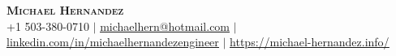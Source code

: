 \documentclass[letterpaper,11pt]{article}
\begin{document}

\begin{center}
    \textbf{\Huge \scshape Michael Hernandez} \\ \vspace{1pt}
    \small +1 503-380-0710 
    $|$ 
    \href{mailto:michaelhern@hotmail.com}{\underline{michaelhern@hotmail.com}} 
    $|$ 
    \href{https://www.linkedin.com/in/michaelhernandezengineer/}{\underline{linkedin.com/in/michaelhernandezengineer}} 
    $|$
    \href{https://michael-hernandez.info/}{\underline{https://michael-hernandez.info/}} 
\end{center}

\begin{comment}
\section{Summary}
\begin{itemize}[leftmargin=0.15in, label={}]
	\small{\item{Software engineering professional proficient in Python, and C++ with prior experience in embedded software validation and development.}}
\end{itemize}
\end{comment}

%
\end{document}
